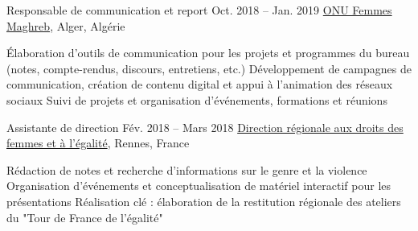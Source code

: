 \begin{joblist}

\item[Responsable de communication et report]{Oct. 2018 -- Jan. 2019 }     
	{
	\href{http://maghreb.unwomen.org/fr}{ONU Femmes Maghreb}, Alger, Algérie
	}     
	{
		\normalsize{
		\vspace{-0.5cm}
		\begin{itemize}
			  \iftbftiny \setlength\itemsep{-3pt} \fi
			  \cvitem[\checkmark] Élaboration d'outils de communication pour les projets et programmes du bureau (notes, compte-rendus, discours, entretiens, etc.)     
              \cvitem[\checkmark] Développement de campagnes de communication, création de contenu digital et appui à l'animation des réseaux sociaux
			  \cvitem[\checkmark] Suivi de projets et organisation d'événements, formations et réunions 
			  
			  
			  
		\end{itemize}      
		}
	}


\item[Assistante de direction]{Fév. 2018 -- Mars 2018 }     
	{
	\href{https://www.egalite-femmes-hommes.gouv.fr/le-secretariat-d-etat/organisation-du-ministere/services-territoriaux/annuaire-des-equipes-regionales-et-departementales/}{Direction régionale aux droits des femmes et à l'égalité}, Rennes, France
	}     
	{
		\normalsize{
		\iftbftiny \vspace{-0.5cm} \fi
		\begin{itemize}
			  \iftbftiny \setlength\itemsep{-3pt} \fi
			  \cvitem[\checkmark] Rédaction de notes et recherche d'informations sur le genre et la violence
			  \cvitem[\checkmark] Organisation d'événements et conceptualisation de matériel interactif pour les présentations
              \cvitem[\checkmark] Réalisation clé : élaboration de la restitution régionale des ateliers du "Tour de France de l’égalité"                                                            
			 

\end{itemize}}}
\end{joblist}
